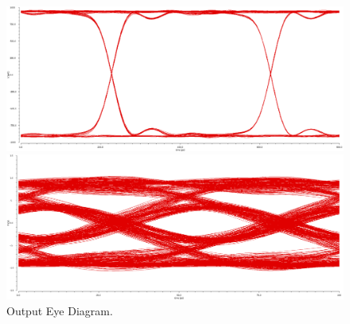 \documentclass{book}  %
\begin{document}
\begin{paper}
\begin{figure}[htbp!]
	\centering	
	\begin{minipage}[tb]{0.5\textwidth}
		\centering	
		\includegraphics[height=0.15\textheight]{./img/channel_response_eye_diagram/output_differential_eye_3gbp.png}
	\end{minipage}%
	\begin{minipage}[tb]{0.5\textwidth}
		\centering	
		\includegraphics[height=0.15\textheight]{./img/channel_response_eye_diagram/output_differential_eye_20gbp.png}
	\end{minipage}
	\caption{Output Eye Diagram.}
	\label{fig:output_differential_eye}
\end{figure}


\end{paper}
\end{document}
